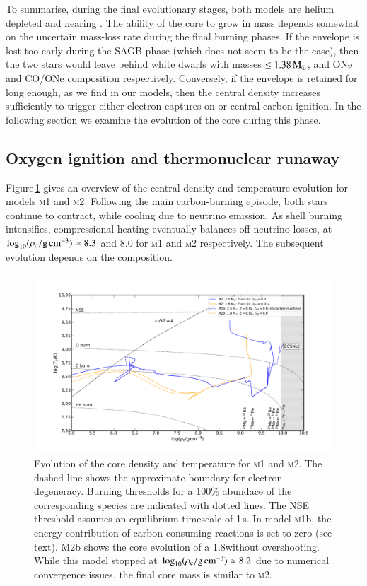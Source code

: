 \documentclass[twocolumn]{aa}
\begin{document}
To summarise, during the final evolutionary stages, both models are helium 
depleted and nearing \mch. The ability of the core 
to grow in mass depends somewhat on the uncertain mass-loss rate during the final burning phases. If the envelope 
is lost too early during the SAGB phase (which does not seem to be the case), then the two stars would 
leave behind white dwarfs with masses $\le 1.38\mathrm{\,M_\odot}$, and ONe and CO/ONe composition respectively. 
Conversely, if the envelope is retained for long enough, as we find in our models, then the central density increases sufficiently to trigger either electron captures on  or central carbon ignition. 
In the following section we examine the evolution of the core during this phase. 




\subsection{Oxygen ignition and thermonuclear runaway}\label{sec:runway}
Figure\,\ref{fig:2} gives an overview of the central density and temperature evolution for models  \textsc{m1} and \textsc{m2}.
Following the main carbon-burning episode, both stars continue to contract, while cooling  due to neutrino  emission. As shell 
burning intensifies, compressional heating eventually balances 
off neutrino losses, at $\log_{10} (\rho_{\mathrm{c}}/ \mathrm{g\,cm^{-3}}) \simeq 8.3$ and 8.0 for \textsc{m1} and \textsc{m2} respectively. The subsequent evolution depends on the composition. 
\begin{figure}[htb!]
\begin{center}
\includegraphics[width=1.0\textwidth]{Rhoc_vs_Tc.pdf}
\caption{Evolution of the core density and temperature for \textsc{m1} and \textsc{m2}. The dashed line shows the approximate boundary for electron degeneracy. Burning thresholds for a 100\% abundace of the corresponding species are indicated with dotted lines. The NSE threshold assumes an equilibrium timescale of 1\,s.  In model \textsc{m1}b, the energy contribution of carbon-consuming reactions is set to zero (see text). \textsc{M2}b shows the core evolution of a 1.8\msun without overshooting. While this model stopped at $\log_{10} (\rho_{\mathrm{c}}/ \mathrm{g\,cm^{-3}}) \simeq 8.2$ due to numerical convergence issues, the final core mass is similar to \textsc{m2}.}
\label{fig:2}
\end{center}
\end{figure}
\end{document}
